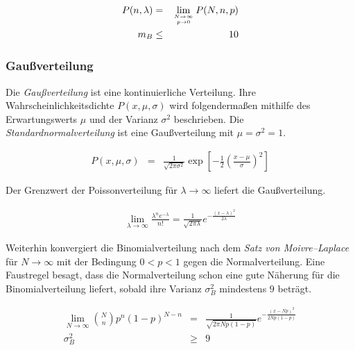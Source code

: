 \documentclass[12pt,a4paper]{scrartcl}
\numberwithin{equation}{section} %
\begin{document}
\begin{eqnarray}
	P(n, \lambda)  &=& \lim_{N \rightarrow \infty \atop p\rightarrow 0} P(N, n, p) \\
	m_B &\leq& 10
\end{eqnarray}

\subsubsection{Gaußverteilung}
\label{Gaußverteilung}
Die \emph{Gaußverteilung} ist eine kontinuierliche Verteilung. Ihre Wahrscheinlichkeitsdichte $P(x,\mu,\sigma)$ wird folgendermaßen mithilfe des Erwartungswerts $\mu$ und der Varianz $\sigma^2$ beschrieben. Die \emph{Standardnormalverteilung}  ist eine Gaußverteilung mit $\mu=\sigma^2=1$.

\begin{eqnarray}
	P(x,\mu,\sigma) &=& \frac{1}{\sqrt{2 \pi\sigma^2}} \exp\left[- \frac{1}{2} \left(\frac{x - \mu}{\sigma}\right)^2\right]
\end{eqnarray}

\noindent
Der Grenzwert der Poissonverteilung für $\lambda \rightarrow \infty$ liefert die Gaußverteilung.

\begin{eqnarray}
	\lim_{\lambda \rightarrow \infty} \frac{\lambda^n e^{-\lambda}}{n!} = \frac{1}{\sqrt{2 \pi \lambda}} e^{- \frac{(x-\lambda)^2}{2\lambda}}
\end{eqnarray}

\noindent
Weiterhin konvergiert die Binomialverteilung nach dem \emph{Satz von Moivre--Laplace} für $N \rightarrow \infty$ mit der Bedingung $0 < p < 1$ gegen die Normalverteilung. Eine Faustregel besagt, dass die Normalverteilung schon eine gute Näherung für die Binomialverteilung liefert, sobald ihre Varianz $\sigma^2_B$ mindestens $9$ beträgt.

\begin{eqnarray}
	\lim_{N \rightarrow \infty} \binom{N}{n} p^n (1-p)^{N-n}
		&=& \frac{1}{\sqrt{2 \pi N p (1-p)}} e^{- \frac{(x - Np)^2}{2 N p (1-p)}} \\
	\sigma^2_B &\geq& 9
\end{eqnarray}
\end{document}

